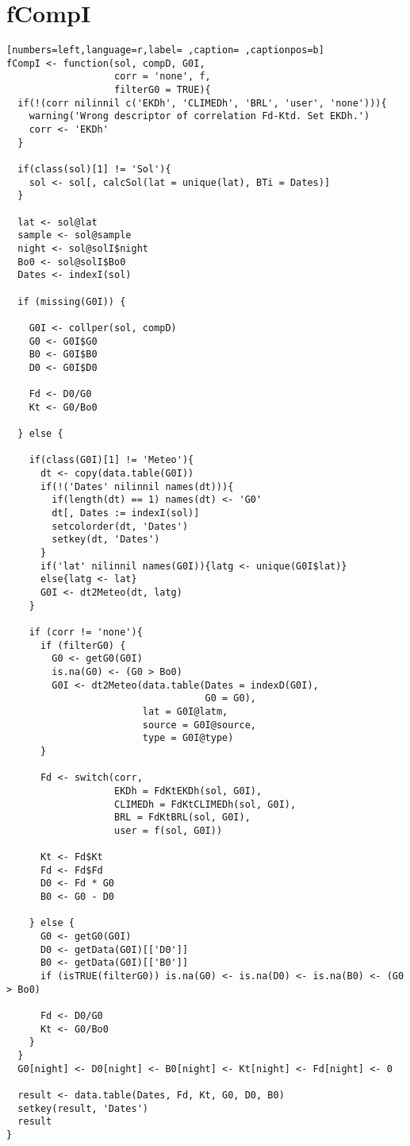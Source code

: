 \section{fCompI}
\label{sec:orga0cdea7}
\begin{lstlisting}[numbers=left,language=r,label= ,caption= ,captionpos=b]
fCompI <- function(sol, compD, G0I,
                   corr = 'none', f,
                   filterG0 = TRUE){
  if(!(corr nilinnil c('EKDh', 'CLIMEDh', 'BRL', 'user', 'none'))){
    warning('Wrong descriptor of correlation Fd-Ktd. Set EKDh.')
    corr <- 'EKDh'
  }

  if(class(sol)[1] != 'Sol'){
    sol <- sol[, calcSol(lat = unique(lat), BTi = Dates)]
  }

  lat <- sol@lat
  sample <- sol@sample
  night <- sol@solI$night
  Bo0 <- sol@solI$Bo0
  Dates <- indexI(sol)

  if (missing(G0I)) { 

    G0I <- collper(sol, compD)
    G0 <- G0I$G0
    B0 <- G0I$B0
    D0 <- G0I$D0

    Fd <- D0/G0
    Kt <- G0/Bo0

  } else { 

    if(class(G0I)[1] != 'Meteo'){
      dt <- copy(data.table(G0I))
      if(!('Dates' nilinnil names(dt))){
        if(length(dt) == 1) names(dt) <- 'G0'
        dt[, Dates := indexI(sol)]
        setcolorder(dt, 'Dates')
        setkey(dt, 'Dates')
      }
      if('lat' nilinnil names(G0I)){latg <- unique(G0I$lat)}
      else{latg <- lat}
      G0I <- dt2Meteo(dt, latg)
    }

    if (corr != 'none'){
      if (filterG0) {
        G0 <- getG0(G0I)
        is.na(G0) <- (G0 > Bo0)
        G0I <- dt2Meteo(data.table(Dates = indexD(G0I),
                                   G0 = G0),
                        lat = G0I@latm,
                        source = G0I@source,
                        type = G0I@type)
      }

      Fd <- switch(corr,
                   EKDh = FdKtEKDh(sol, G0I),
                   CLIMEDh = FdKtCLIMEDh(sol, G0I),
                   BRL = FdKtBRL(sol, G0I), 
                   user = f(sol, G0I))

      Kt <- Fd$Kt
      Fd <- Fd$Fd
      D0 <- Fd * G0
      B0 <- G0 - D0

    } else { 
      G0 <- getG0(G0I)
      D0 <- getData(G0I)[['D0']]
      B0 <- getData(G0I)[['B0']]
      if (isTRUE(filterG0)) is.na(G0) <- is.na(D0) <- is.na(B0) <- (G0 > Bo0)

      Fd <- D0/G0
      Kt <- G0/Bo0
    }
  }
  G0[night] <- D0[night] <- B0[night] <- Kt[night] <- Fd[night] <- 0

  result <- data.table(Dates, Fd, Kt, G0, D0, B0)
  setkey(result, 'Dates')
  result
}
\end{lstlisting}
